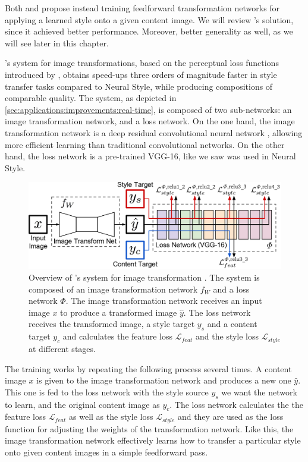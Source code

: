 Both \citet{Ulyanov2016} and \citet{Johnson2016} propose instead training feedforward transformation networks for applying a learned style onto a given content image.
We will review \citeauthor{Johnson2016}'s solution, since it achieved better performance.
Moreover, better generality as well, as we will see later in this chapter.

\citeauthor{Johnson2016}'s system for image transformations, based on the perceptual loss functions introduced by \citeauthor{Gatys2015B}, obtains speed-ups three orders of magnitude faster in style transfer tasks compared to Neural Style, while producing compositions of comparable quality.
The system, as depicted in \autoref{sec:applications:improvements:real-time}, is composed of two sub-networks: an image transformation network, and a loss network.
On the one hand, the image transformation network is a deep residual convolutional neural network \cite{He2015}, allowing more efficient learning than traditional convolutional networks.
On the other hand, the loss network is a pre-trained VGG-16, like we saw was used in Neural Style.

\begin{figure}[t]
  \includegraphics[width=\textwidth]{gfx/app-real-time}
  \caption{
    Overview of \citeauthor{Johnson2016}'s system for image transformation \cite{Johnson2016}.
    The system is composed of an image transformation network $f_W$ and a loss network $\mathit{\Phi}$.
    The image transformation network receives an input image $x$ to produce a transformed image $\hat{y}$.
    The loss network receives the transformed image, a style target $y_s$ and a content target $y_c$ and calculates the feature loss $\mathcal{L}_{feat}$ and the style loss $\mathcal{L}_{style}$ at different stages.
  }
  \label{sec:applications:improvements:real-time}
\end{figure}

The training works by repeating the following process several times.
A content image $x$ is given to the image transformation network and produces a new one $\hat{y}$.
This one is fed to the loss network with the style source $y_s$ we want the network to learn, and the original content image as $y_c$.
The loss network calculates the the feature loss $\mathcal{L}_{feat}$ as well as the style loss $\mathcal{L}_{style}$ and they are used as the loss function for adjusting the weights of the transformation network.
Like this, the image transformation network effectively learns how to transfer a particular style onto given content images in a simple feedforward pass.

